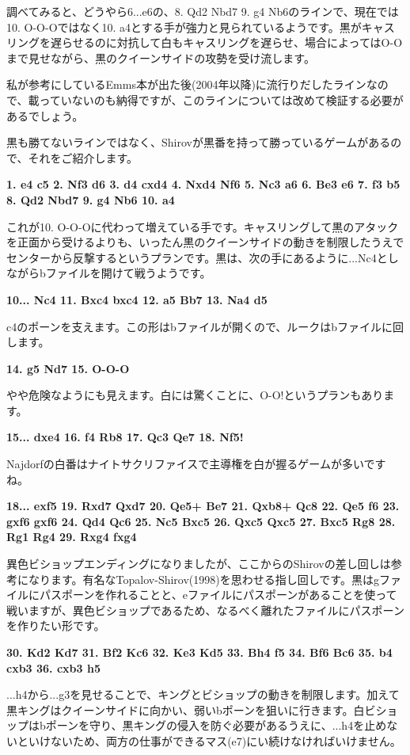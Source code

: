 調べてみると、どうやら6...e6の、8. Qd2 Nbd7 9. g4 Nb6のラインで、現在では10. O-O-Oではなく10. a4とする手が強力と見られているようです。黒がキャスリングを遅らせるのに対抗して白もキャスリングを遅らせ、場合によってはO-Oまで見せながら、黒のクイーンサイドの攻勢を受け流します。

私が参考にしているEmms本が出た後(2004年以降)に流行りだしたラインなので、載っていないのも納得ですが、このラインについては改めて検証する必要があるでしょう。

黒も勝てないラインではなく、Shirovが黒番を持って勝っているゲームがあるので、それをご紹介します。

{\bf 1. e4 c5 2. Nf3 d6 3. d4 cxd4 4. Nxd4 Nf6 5. Nc3 a6 6. Be3 e6 7. f3 b5 8. Qd2
Nbd7 9. g4 Nb6 10. a4}

これが10. O-O-Oに代わって増えている手です。キャスリングして黒のアタックを正面から受けるよりも、いったん黒のクイーンサイドの動きを制限したうえでセンターから反撃するというプランです。黒は、次の手にあるように...Nc4としながらbファイルを開けて戦うようです。

{\bf 10... Nc4 11. Bxc4 bxc4 12. a5 Bb7 13. Na4 d5}

c4のポーンを支えます。この形はbファイルが開くので、ルークはbファイルに回します。

{\bf 14. g5 Nd7 15. O-O-O}

やや危険なようにも見えます。白には驚くことに、O-O!というプランもあります。

{\bf 15... dxe4 16. f4 Rb8 17. Qc3 Qe7 18. Nf5!}

Najdorfの白番はナイトサクリファイスで主導権を白が握るゲームが多いですね。

{\bf 18... exf5 19. Rxd7 Qxd7 20. Qe5+ Be7 21. Qxb8+ Qc8 22. Qe5 f6 23. gxf6 gxf6 24. Qd4 Qc6 25. Nc5 Bxc5 26. Qxc5 Qxc5 27. Bxc5 Rg8 28. Rg1 Rg4 29. Rxg4 fxg4}

異色ビショップエンディングになりましたが、ここからのShirovの差し回しは参考になります。有名なTopalov-Shirov(1998)を思わせる指し回しです。黒はgファイルにパスポーンを作れることと、eファイルにパスポーンがあることを使って戦いますが、異色ビショップであるため、なるべく離れたファイルにパスポーンを作りたい形です。

{\bf 30. Kd2 Kd7 31. Bf2 Kc6 32. Ke3 Kd5 33. Bh4 f5 34. Bf6 Bc6 35. b4 cxb3 36. cxb3 h5}

...h4から...g3を見せることで、キングとビショップの動きを制限します。加えて黒キングはクイーンサイドに向かい、弱いbポーンを狙いに行きます。白ビショップはbポーンを守り、黒キングの侵入を防ぐ必要があるうえに、...h4を止めないといけないため、両方の仕事ができるマス(e7)にい続けなければいけません。

